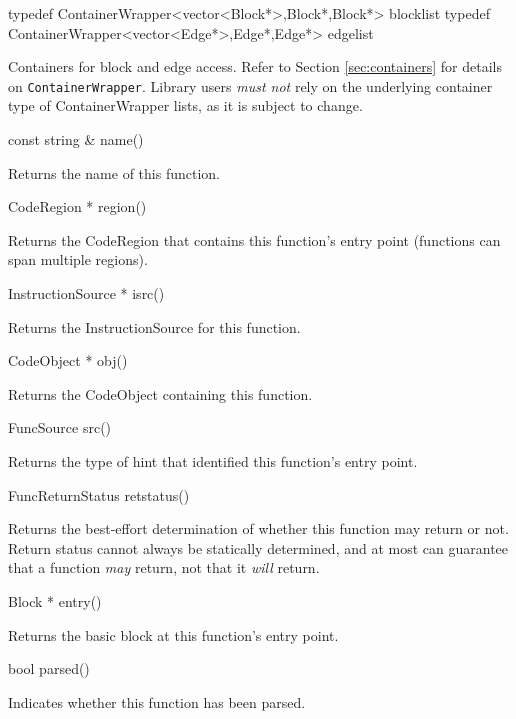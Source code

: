\documentclass{article}
\newenvironment{apient}{\small\verbatim}{\endverbatim}
\newcommand{\apidesc}[1]{%
{\addtolength{\leftskip}{4em}%
#1\par\medskip}
}
\begin{document}
\begin{apient}
typedef ContainerWrapper<vector<Block*>,Block*,Block*> blocklist
typedef ContainerWrapper<vector<Edge*>,Edge*,Edge*> edgelist
\end{apient}
\apidesc{Containers for block and edge access. Refer to Section \ref{sec:containers} for details on \texttt{ContainerWrapper}. Library users \emph{must not} rely on the underlying container type of ContainerWrapper lists, as it is subject to change.}

\begin{apient}
const string & name()
\end{apient}
\apidesc{Returns the name of this function.}

\begin{apient}
CodeRegion * region()
\end{apient}
\apidesc{Returns the CodeRegion that contains this function's entry point (functions can span multiple regions).}

\begin{apient}
InstructionSource * isrc()
\end{apient}
\apidesc{Returns the InstructionSource for this function.}

\begin{apient}
CodeObject * obj()
\end{apient}
\apidesc{Returns the CodeObject containing this function.}

\begin{apient}
FuncSource src()
\end{apient}
\apidesc{Returns the type of hint that identified this function's entry point.}

\begin{apient}
FuncReturnStatus retstatus()
\end{apient}
\apidesc{Returns the best-effort determination of whether this function may return or not. Return status cannot always be statically determined, and at most can guarantee that a function \emph{may} return, not that it \emph{will} return.}

\begin{apient}
Block * entry()
\end{apient}
\apidesc{Returns the basic block at this function's entry point.}

\begin{apient}
bool parsed()
\end{apient}
\apidesc{Indicates whether this function has been parsed.}
\end{document}
